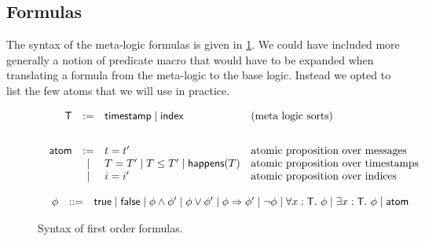 \subsection{Formulas}

The syntax of the meta-logic formulas is given in \cref{fig:syntax}.
We could have included more generally a notion of predicate macro that
would have to be expanded when translating a formula from the meta-logic
to the base logic. Instead we opted to list the few atoms that we
will use in practice.

\begin{figure}
  \[
  \begin{array}{c}
   \begin{array}{rcll}
    \textsf{T} &  := & \textsf{timestamp} \mid \textsf{index} & \text{(meta logic sorts)} \\
    \\[2ex]
   \textsf{atom} & := & t=t'
 & \text{atomic proposition over messages } \\
  &\mid & T=T' \mid T \leq T' \mid \textsf{happens}(T) &  \text{atomic proposition
  over timestamps } \\
  &\mid & i=i'  &  \text{atomic proposition
    over indices } \\
    \end{array}
\\
\\
     \begin{array}{rcll}
    \phi & ::= &  \textsf{true} \mid \textsf{false} \mid \phi \wedge \phi' \mid  \phi
    \vee \phi' \mid   \phi \Rightarrow \phi'\mid \neg \phi \mid
    \forall x : \textsf{T}.\ \phi \mid \exists x:\textsf{T}.\ \phi \mid \textsf{atom} &
    \end{array}

\end{array}
    \]
    \caption{Syntax of first order formulas.}\label{fig:syntax}
\end{figure}

